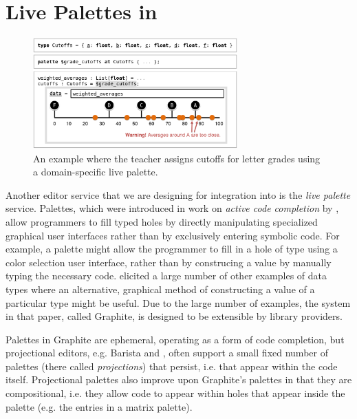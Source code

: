 
\section{Live Palettes in \Hazel}
\label{sec:palettes}


\begin{figure}[t]
\vspace{-4px}
\includegraphics[width=0.7\textwidth]{images/cutoffs-new-elided.png}
\caption{An example where the teacher assigns cutoffs 
for letter grades using a domain-specific live palette.}
\label{fig:cutoffs-example}
\vspace{-7px}
\end{figure}

Another editor service that we are designing for integration into \Hazel 
is the \emph{live palette} service.
Palettes, which were introduced in work on
\emph{active code completion} by \citet{ActiveCodeCompletion},  allow programmers to fill typed 
holes by directly manipulating specialized graphical user interfaces rather than by exclusively entering symbolic
code. For example, a palette might allow the programmer to 
fill in a hole of type  using a color selection  
user interface, rather than by construcing a  value  
by manually typing the necessary code. \citet{ActiveCodeCompletion} elicited a large number of other
examples of data types where an alternative, graphical 
method of constructing a value of a particular type might be
useful. Due to the large number of examples, the system in that paper, called {Graphite}, is designed to be extensible by library providers. 

Palettes in {Graphite} 
are ephemeral, operating as a form of code completion, but projectional editors, e.g. Barista \cite{ko_barista:_2006} and  \cite{voelter_mbeddr:_2012}, often support a small fixed number of  
palettes (there called \emph{projections}) that persist, i.e. that appear within the code itself. 
Projectional palettes also improve upon Graphite's palettes in that they are compositional, i.e. they allow code to appear within holes that appear inside the palette (e.g. the entries in a matrix palette). 

